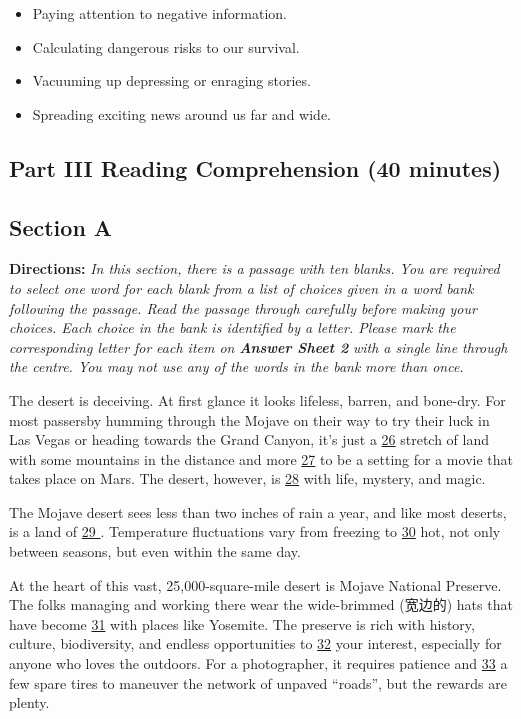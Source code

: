 \documentclass[UTF8,11pt]{ctexart}
\begin{document}
\begin{itemize}[leftmargin=2em,itemsep=.2em,topsep=.4em]\item[A.] Paying attention to negative information.
\item[B.] Calculating dangerous risks to our survival.
\item[C.] Vacuuming up depressing or enraging stories.
\item[D.] Spreading exciting news around us far and wide.
\end{itemize}

\subsection*{\textbf{Part III Reading Comprehension (40 minutes)}}


\subsection*{\textbf{Section A}}


\textbf{Directions:} \textit{In this section, there is a passage with ten blanks. You are required to select one word for each blank} \textit{from a list of choices given in a word bank following the passage. Read the passage through carefully before} \textit{making your choices. Each choice in the bank is identified by a letter. Please mark the corresponding letter for} \textit{each item on }\textbf{\textit{Answer Sheet 2}}\textit{ with a single line through the centre. You may not use any of the words in the bank} \textit{more than once.}


The desert is deceiving. At first glance it looks lifeless, barren, and bone-dry. For most passersby humming through the Mojave on their way to try their luck in Las Vegas or heading towards the Grand Canyon, it’s just a \uline{26} stretch of land with some mountains in the distance and more \uline{27} to be a setting for a movie that takes place on Mars. The desert, however, is \uline{28} with life, mystery, and magic.


The Mojave desert sees less than two inches of rain a year, and like most deserts, is a land of \uline{29 }. Temperature fluctuations vary from freezing to \uline{30} hot, not only between seasons, but even within the same day.


At the heart of this vast, 25,000-square-mile desert is Mojave National Preserve. The folks managing and working there wear the wide-brimmed (宽边的) hats that have become \uline{31} with places like Yosemite. The preserve is rich with history, culture, biodiversity, and endless opportunities to \uline{32} your interest, especially for anyone who loves the outdoors. For a photographer, it requires patience and \uline{33} a few spare tires to maneuver the network of unpaved “roads”, but the rewards are plenty.
\end{document}
